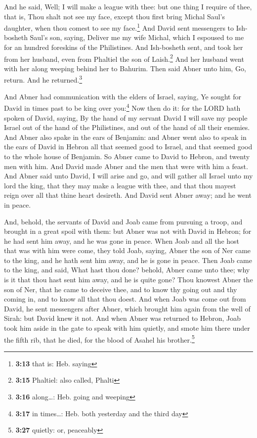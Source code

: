  And he said, Well; I will make a league with thee: but
one thing I require of thee, that is, Thou shalt not see my face, except
thou first bring Michal Saul's daughter, when thou comest to see my
face.\footnote{\textbf{3:13} that is: Heb. saying}  And
David sent messengers to Ish-bosheth Saul's son, saying, Deliver me my
wife Michal, which I espoused to me for an hundred foreskins of the
Philistines.  And Ish-bosheth sent, and took her from her
husband, even from Phaltiel the son of Laish.\footnote{\textbf{3:15}
  Phaltiel: also called, Phalti}  And her husband went
with her along weeping behind her to Bahurim. Then said Abner unto him,
Go, return. And he returned.\footnote{\textbf{3:16} along\ldots: Heb.
  going and weeping}

 And Abner had communication with the elders of Israel,
saying, Ye sought for David in times past to be king over
you:\footnote{\textbf{3:17} in times\ldots: Heb. both yesterday and the
  third day}  Now then do it: for the LORD hath spoken of
David, saying, By the hand of my servant David I will save my people
Israel out of the hand of the Philistines, and out of the hand of all
their enemies.  And Abner also spake in the ears of
Benjamin: and Abner went also to speak in the ears of David in Hebron
all that seemed good to Israel, and that seemed good to the whole house
of Benjamin.  So Abner came to David to Hebron, and
twenty men with him. And David made Abner and the men that were with him
a feast.  And Abner said unto David, I will arise and go,
and will gather all Israel unto my lord the king, that they may make a
league with thee, and that thou mayest reign over all that thine heart
desireth. And David sent Abner away; and he went in peace.

 And, behold, the servants of David and Joab came from
pursuing a troop, and brought in a great spoil with them: but Abner was
not with David in Hebron; for he had sent him away, and he was gone in
peace.  When Joab and all the host that was with him were
come, they told Joab, saying, Abner the son of Ner came to the king, and
he hath sent him away, and he is gone in peace.  Then
Joab came to the king, and said, What hast thou done? behold, Abner came
unto thee; why is it that thou hast sent him away, and he is quite gone?
 Thou knowest Abner the son of Ner, that he came to
deceive thee, and to know thy going out and thy coming in, and to know
all that thou doest.  And when Joab was come out from
David, he sent messengers after Abner, which brought him again from the
well of Sirah: but David knew it not.  And when Abner was
returned to Hebron, Joab took him aside in the gate to speak with him
quietly, and smote him there under the fifth rib, that he died, for the
blood of Asahel his brother.\footnote{\textbf{3:27} quietly: or,
  peaceably}

